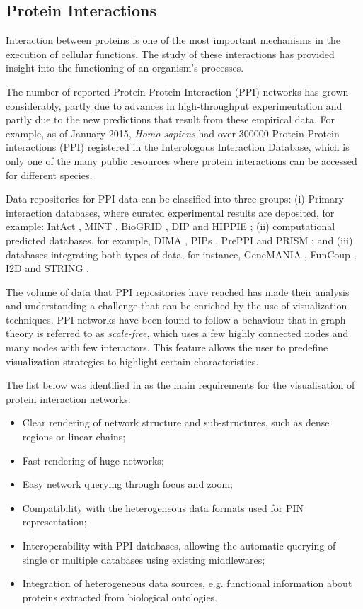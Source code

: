 \subsection{Protein Interactions}
Interaction between proteins is one of the most important mechanisms in the execution of cellular functions. The study of these interactions has provided insight into the functioning of an organism's processes.

The number of reported Protein-Protein Interaction (PPI) networks has grown considerably, partly due to advances in high-throughput experimentation and partly due to the new predictions that result from these empirical data. For example, as of January 2015, \emph{Homo sapiens} had over 300000 Protein-Protein interactions (PPI) registered in the Interologous Interaction Database, which is only one of the many public resources where protein interactions can be accessed for different species. 

Data repositories for PPI data can be classified into three groups: (i) Primary interaction databases, where curated experimental results are deposited, for example: IntAct \cite{KER2012}, MINT \cite{LIC2012}, BioGRID \cite{STA2006}, DIP \cite{SAL2004} and HIPPIE \cite{SCH2012}; (ii) computational predicted databases, for example, DIMA \cite{LUO2011}, PIPs \cite{MCD2009}, PrePPI \cite{ZHA2012} and PRISM \cite{OGM2005}; and (iii) databases integrating both types of data, for instance, GeneMANIA \cite{WAR2010}, FunCoup \cite{SCH2014}, I2D \cite{NIU2010} and STRING \cite{SZK2014}.

The volume of data that PPI repositories have reached has made their analysis and understanding a challenge that can be enriched by the use of visualization techniques. PPI networks have been found to follow a behaviour that in graph theory is referred to as \emph{scale-free}, which uses a few highly connected nodes and many nodes with few interactors. This feature allows the user to predefine visualization strategies to highlight certain characteristics.

The list below was identified in \cite{AGA2013} as the main requirements for the visualisation of protein interaction networks:
\begin{itemize}
\setlength\itemsep{-0.3em}
        \item Clear rendering of network structure and sub-structures, such as dense regions or linear chains;
        \item Fast rendering of huge networks;
        \item Easy network querying through focus and zoom;
        \item Compatibility with the heterogeneous data formats used for PIN representation;
        \item Interoperability with PPI databases, allowing the automatic querying of single or multiple databases using existing middlewares;
        \item Integration of heterogeneous data sources, e.g. functional information about proteins extracted from biological ontologies.
\end{itemize}

